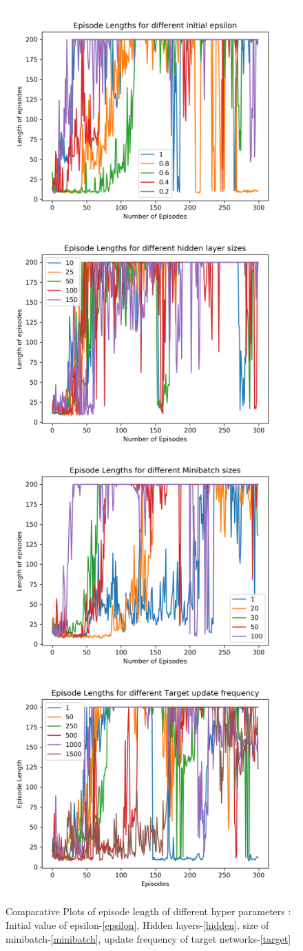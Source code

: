 \documentclass[preprint,12pt]{elsarticle}
\begin{document}
    \begin{figure}[H]
    	\centering  
    	\subfigure
    	{\includegraphics[width=0.4\linewidth]{./Episode_lengths_EPSILONs.png}\label{epsilon_len}}
    	\subfigure
    	{\includegraphics[width=0.4\linewidth]{./Episode_lengths_HiddenSizes.png}\label{hidden_len}}
    	\subfigure
    	{\includegraphics[width=0.4\linewidth]{./Episode_lengths_MINIBATCHs.png}\label{minibatch_len}}
    	\subfigure
    	{\includegraphics[width=0.4\linewidth]{./Episode_lengths_TARGETs.png}\label{target_len}}
    	\caption{Comparative Plots of episode length of different hyper parameters : Initial value of epsilon-\ref{epsilon}, Hidden layers-\ref{hidden}, size of minibatch-\ref{minibatch}, update frequency of target networks-\ref{target}}
    	\label{fig:episo_len}
    \end{figure}
    
    
\end{document}
